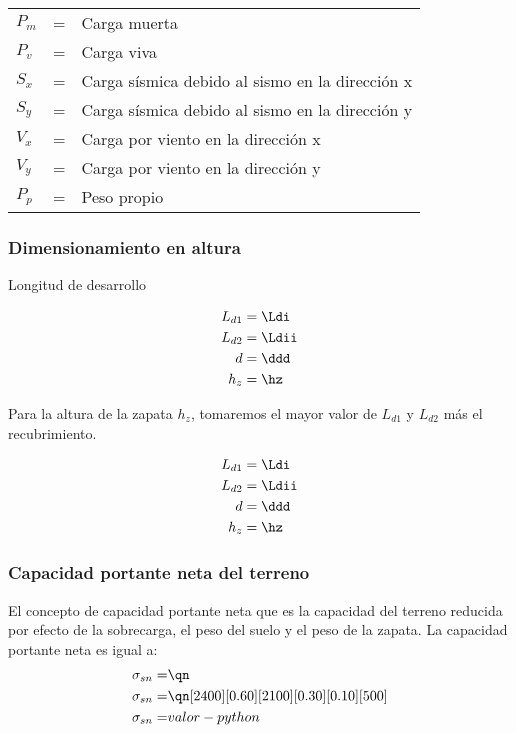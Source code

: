 \documentclass{article}%
\begin{document}
\begin{table}[h!]
    \centering
    \begin{tabular}{lll}
        $P_m$ &=&   Carga muerta\\
        $P_v$ &=&   Carga viva\\
        $S_x$ &=&   Carga sísmica debido al sismo en la dirección x\\
        $S_y$ &=&   Carga sísmica debido al sismo en la dirección y\\
        $V_x$ &=&   Carga por viento en la dirección x\\
        $V_y$ &=&   Carga por viento en la dirección y\\
        $P_p$ &=&   Peso propio\\
    \end{tabular}
\end{table}

\subsubsection{Dimensionamiento en altura}
Longitud de desarrollo

\begin{align}
	L_{d1} &= \Ldi\\
	L_{d2} &= \Ldii\\
	d      &= \ddd \\
	h_z	   &= \hz
\end{align}

Para la altura de la zapata $h_z$, tomaremos el mayor valor de $L_{d1}$ y $L_{d2}$ más el recubrimiento.

\begin{align*}
    L_{d1} &= \Ldi\\
	L_{d2} &= \Ldii\\
	d      &= \ddd \\
	h_z	   &= \hz
\end{align*}

\subsubsection{Capacidad portante neta del terreno}

El concepto de capacidad portante neta que es la capacidad del terreno reducida por efecto de la sobrecarga, el peso del suelo y el peso de la zapata. La capacidad portante neta es igual a:
\begin{align}
	\sigma_{sn} =&\qn \\
	\sigma_{sn} =&\qn[2400][0.60][2100][0.30][0.10][500]\\
	\sigma_{sn} =& valor-python \nonumber
\end{align}
\end{document}

